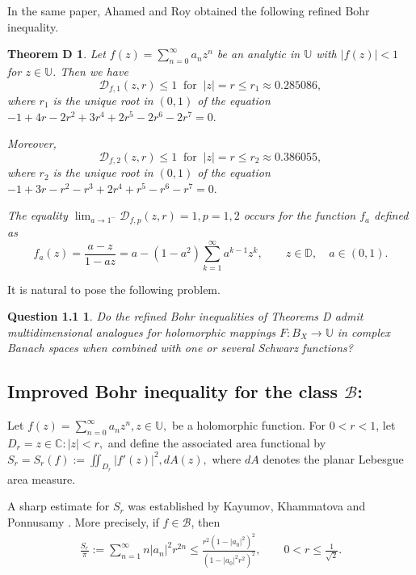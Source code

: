 \documentclass[11pt, reqno]{amsart}
\newtheorem*{theoD}{Theorem D}
\newtheorem*{cor A}{Corollary A}
\newtheorem*{cor B}{Corollary B}
\newtheorem*{que1}{Question 1.1}
\newcommand{\bea}{\begin{eqnarray}}
\newcommand{\eea}{\end{eqnarray}}
\numberwithin{equation}{section}
\begin{document}
In the same paper, Ahamed and Roy \cite{AR2025} obtained the following refined Bohr inequality.
\begin{theoD}\cite[Theorem 2.2.]{AR2025}
Let $f(z)=\sum_{n=0}^{\infty} a_n z^n $ be an analytic in $\mathbb{U}$ with $|f(z)|<1$ for $z\in \mathbb{U}$.
Then we have \[
\mathcal{D}_{f,1}(z,r)\leq 1\;\;\text{for}\;\;|z|=r\leq r_1\approx 0.285086,\]
 where $r_1$ is the unique root in $(0,1)$ of the equation $-1+4r-2r^2+3r^4+2r^5-2r^6-2r^7=0.$

Moreover, 
\[\mathcal{D}_{f,2}(z,r)\leq 1\;\;\text{for}\;\;|z|=r\leq r_2\approx 0.386055,\]
 where $r_2$ is the unique root in $(0,1)$ of the equation $-1+3r-r^2-r^3+2r^4+r^5-r^6-r^7=0.$


The equality $\lim_{a\to 1^-} \mathcal{D}_{f,p}(z,r)=1, p=1,2$ occurs for the function  $f_a$ defined as
\begin{equation}
f_a(z)
=\frac{a-z}{1-az}
= a-(1-a^2)\sum_{k=1}^{\infty} a^{k-1} z^k,
\qquad z\in\mathbb{D},
\quad a\in(0,1).
\end{equation}
\end{theoD}
 
It is natural to pose the following problem.

\begin{que1}
Do the refined Bohr inequalities of Theorems D admit multidimensional analogues for holomorphic mappings $F:B_X\to \mathbb{U}$
 in complex Banach spaces when combined with one or several Schwarz functions? 
 \end{que1}
 \subsection{\bf Improved Bohr inequality for the class $\mathcal{B}$:}

Let $f(z)=\sum_{n=0}^{\infty}a_nz^n, z\in\mathbb U,$ be a holomorphic function. For $0<r<1$, let $D_r={z\in\mathbb C:|z|<r},$ and define the associated area functional by $S_r=S_r(f):=\iint_{D_r}|f'(z)|^2,dA(z),$ where $dA$ denotes the planar Lebesgue area measure.

A sharp estimate for $S_r$ was established by Kayumov, Khammatova and Ponnusamy \cite{KKP2021}. More precisely, if $f\in\mathcal B$, then
\bea\label{Sr}
\frac{S_r}{\pi}:=\sum_{n=1}^{\infty}n|a_n|^2r^{2n}
\le
\frac{r^2(1-|a_0|^2)^2}
{(1-|a_0|^2r^2)^2},
\qquad
0<r\le\frac1{\sqrt2}.
\eea
\end{document}
